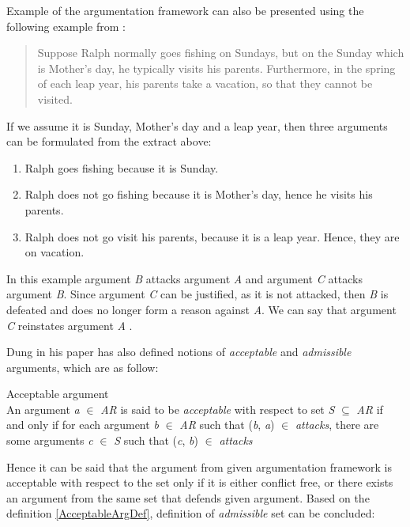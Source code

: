 Example of the argumentation framework can also be presented using the following example from \citet{konolige1988defeasible}:
\begin{quote}
Suppose Ralph normally goes fishing on Sundays, but on the Sunday which is
Mother’s day, he typically visits his parents. Furthermore, in the spring of each
leap year, his parents take a vacation, so that they cannot be visited.
\end{quote}
If we assume it is Sunday, Mother's day and a leap year, then three arguments can be formulated from the extract above:
\begin{enumerate}[label=\Alph*]
	\item{Ralph goes fishing because it is Sunday.}
	\item{Ralph does not go fishing because it is Mother's day, hence he visits his parents.}
	\item{Ralph does not go visit his parents, because it is a leap year. Hence, they are on vacation.}
\end{enumerate}
In this example argument \textit{B} attacks argument \textit{A} and argument \textit{C} attacks argument \textit{B}. Since argument \textit{C} can be justified, as it is not attacked, then \textit{B} is defeated and does no longer form a reason against \textit{A}. We can say that argument \textit{C} reinstates argument \textit{A} \citep{caminada2004sake}.


Dung in his paper \citep{dung1995} has also defined notions of \textit{acceptable} and \textit{admissible} arguments, which are as follow:

\begin{definition}{Acceptable argument}
\label{AcceptableArgDef}\\
An argument \textit{a} $\in$ \textit{AR} is said to be \textit{acceptable} with respect to set \textit{S} $\subseteq$ \textit{AR} if and only if for each argument \textit{b} $\in$ \textit{AR} such that (\textit{b}, \textit{a}) $\in$ \textit{attacks}, there are some arguments \textit{c} $\in$ \textit{S} such that (\textit{c}, \textit{b}) $\in$ \textit{attacks}
\end{definition}

Hence it can be said that the argument from given argumentation framework is acceptable with respect to the set only if it is either conflict free, or there exists an argument from the same set that defends given argument. Based on the definition \ref{AcceptableArgDef}, definition of \textit{admissible} set can be concluded:

